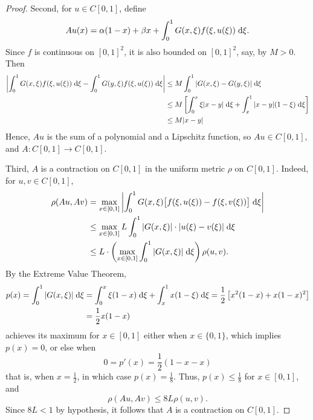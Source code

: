 \documentclass{homework}
\begin{document}
\begin{enumerate}[label=\textbf{(\roman*)}]
\begin{proof}
			Second, for $u\in C[0,1]$, define
			\begin{equation}
				Au(x) = \alpha(1-x) + \beta x + \int_0^1G(x,\xi)f(\xi, u(\xi))\;\text{d}\xi.
			\end{equation}
			Since $f$ is continuous on $[0,1]^2$, it is also bounded on $[0,1]^2$, say, by $M > 0$. Then
			\begin{align*}
				\left|\int_0^1 G(x,\xi)f(\xi, u(\xi))\;\text{d}\xi - \int_0^1G(y,\xi)f(\xi,u(\xi))\;\text{d}\xi\right| &\le M \int_0^1|G(x,\xi) - G(y,\xi)|\;\text{d}\xi \\
				&\le M\left[\int_0^x  \xi|x-y|\;\text{d}\xi + \int_x^1 |x-y|(1-\xi)\;\text{d}\xi\right] \\
				&\le M |x-y|
			\end{align*}
			Hence, $Au$ is the sum of a polynomial and a Lipschitz function, so $Au \in C[0,1]$, and $A : C[0,1] \to C[0,1]$.
			
			Third, $A$ is a contraction on $C[0,1]$ in the uniform metric $\rho$ on $C[0,1]$. Indeed, for $u, v \in C[0,1]$,
			\begin{align}
				\rho(Au,Av) &= \max_{x\in[0,1]}\left|\int_0^1G(x,\xi)\big[f(\xi, u(\xi))-f(\xi,v(\xi))\big]\;\text{d}\xi\right| \\
				&\le \max_{x\in[0,1]} L\int_0^1|G(x,\xi)| \cdot|u(\xi) - v(\xi)|\;\text{d}\xi \\
				&\le L \cdot\left(\max_{x\in[0,1]}\int_0^1 |G(x,\xi)|\;\text{d}\xi\right)\rho(u,v).
			\end{align}
			By the Extreme Value Theorem,
			\begin{equation}
				\begin{aligned}
					p(x) = \int_0^1|G(x,\xi)|\;\text{d}\xi &= \int_0^x \xi(1-x)\;\text{d}\xi + \int_x^1x(1-\xi)\;\text{d}\xi = \frac{1}{2}\left[x^2(1-x) + x(1-x)^2\right] \\
					&= \frac{1}{2}x(1-x)
				\end{aligned}
			\end{equation}
			achieves its maximum for $x \in [0,1]$ either when $x \in \{0,1\}$, which implies $p(x) = 0$, or else when 
			\begin{equation}
				0 = p'(x) = \frac{1}{2}(1-x - x)
			\end{equation}
			that is, when $x = \frac{1}{2}$, in which case $p(x) = \frac{1}{8}$. Thus, $p(x) \le \frac{1}{8}$ for $x \in [0,1]$, and
			\begin{equation}
				\rho(Au,Av) \le 8L \rho(u,v).
			\end{equation}
			Since $8L < 1$ by hypothesis, it follows that $A$ is a contraction on $C[0,1]$.
			

\end{proof}
\end{enumerate}
\end{document}
